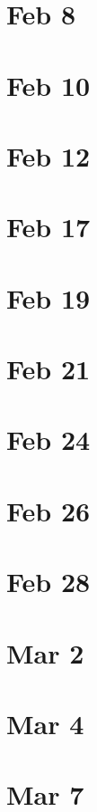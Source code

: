 \documentclass[12pt]{book}
\newcommand{\<}{\langle}
\renewcommand{\>}{\rangle}
\numberwithin{equation}{section}
\theoremstyle{plain}
\theoremstyle{definition}
\theoremstyle{remark}
\begin{document}
\section*{Feb 8}

\section*{Feb 10}

\section*{Feb 12}

\section*{Feb 17}

\section*{Feb 19}

\section*{Feb 21}

\section*{Feb 24}

\section*{Feb 26}

\section*{Feb 28}

\section*{Mar 2}

\section*{Mar 4}

\section*{Mar 7}
\end{document}
